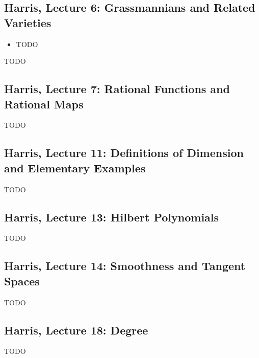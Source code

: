 \subsection{Harris, Lecture 6: Grassmannians and Related Varieties}

\begin{itemize}
\item
  TODO
\end{itemize}

TODO

\subsection{Harris, Lecture 7: Rational Functions and Rational Maps}

TODO

\subsection{Harris, Lecture 11: Definitions of Dimension and Elementary Examples}

TODO

\subsection{Harris, Lecture 13: Hilbert Polynomials}

TODO

\subsection{Harris, Lecture 14: Smoothness and Tangent Spaces}

TODO

\subsection{Harris, Lecture 18: Degree}

TODO

